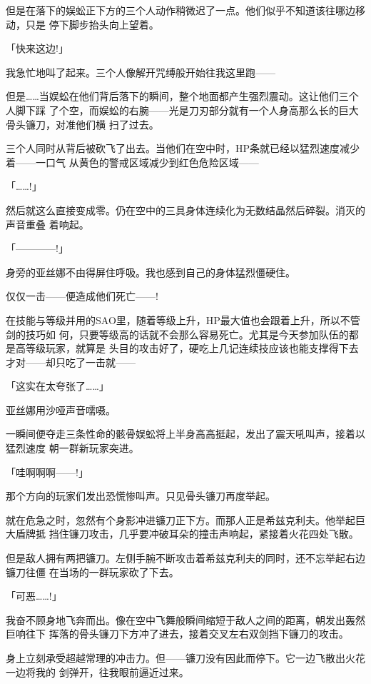 \documentclass[11pt]{book}
\begin{document}
但是在落下的娱蚣正下方的三个人动作稍微迟了一点。他们似乎不知道该往哪边移动，只是
停下脚步抬头向上望着。

「快来这边!」

我急忙地叫了起来。三个人像解开咒缚般开始往我这里跑——

但是……当娱蚣在他们背后落下的瞬间，整个地面都产生强烈震动。这让他们三个人脚下踩
了个空，而娱蚣的右腕——光是刀刃部分就有一个人身高那么长的巨大骨头镰刀，对准他们横
扫了过去。







三个人同时从背后被砍飞了出去。当他们在空中时，HP条就已经以猛烈速度减少着——一口气
从黄色的警戒区域减少到红色危险区域——

「……!」

然后就这么直接变成零。仍在空中的三具身体连续化为无数结晶然后碎裂。消灭的声音重叠
着响起。

「————!」

身旁的亚丝娜不由得屏住呼吸。我也感到自己的身体猛烈僵硬住。

仅仅一击——便造成他们死亡——!

在技能与等级并用的SAO里，随着等级上升，HP最大值也会跟着上升，所以不管剑的技巧如
何，只要等级高的话就不会那么容易死亡。尤其是今天参加队伍的都是高等级玩家，就算是
头目的攻击好了，硬吃上几记连续技应该也能支撑得下去才对——却只吃了一击就——

「这实在太夸张了……」

亚丝娜用沙哑声音嚅嗫。

一瞬间便夺走三条性命的骸骨娱蚣将上半身高高挺起，发出了震天吼叫声，接着以猛烈速度
朝一群新玩家突进。

「哇啊啊啊——!」

那个方向的玩家们发出恐慌惨叫声。只见骨头镰刀再度举起。

就在危急之时，忽然有个身影冲进镰刀正下方。而那人正是希兹克利夫。他举起巨大盾牌抵
挡住镰刀攻击，几乎要冲破耳朵的撞击声响起，紧接着火花四处飞散。

但是敌人拥有两把镰刀。左侧手腕不断攻击着希兹克利夫的同时，还不忘举起右边镰刀往僵
在当场的一群玩家砍了下去。

「可恶……!」

我奋不顾身地飞奔而出。像在空中飞舞般瞬间缩短于敌人之间的距离，朝发出轰然巨响往下
挥落的骨头镰刀下方冲了进去，接着交叉左右双剑挡下镰刀的攻击。

身上立刻承受超越常理的冲击力。但——镰刀没有因此而停下。它一边飞散出火花一边将我的
剑弹开，往我眼前逼近过来。
\end{document}
